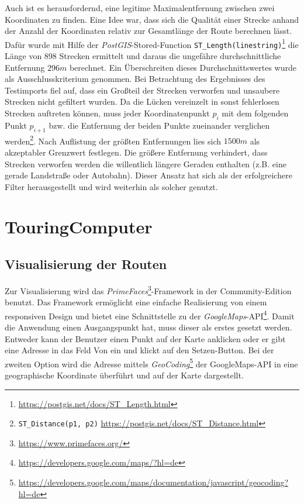 \documentclass[a4paper,11pt,utf8]{scrartcl}
\begin{document}
Auch ist es herausfordernd, eine legitime Maximalentfernung zwischen zwei Koordinaten zu finden. Eine Idee war, dass sich die Qualität einer Strecke anhand der Anzahl der Koordinaten relativ zur Gesamtlänge der Route berechnen lässt. Dafür wurde mit Hilfe der \textit{PostGIS}-Stored-Function \texttt{ST\_Length(linestring)}\footnote{\url{https://postgis.net/docs/ST_Length.html}} die Länge von 898 Strecken ermittelt und daraus die ungefähre durchschnittliche Entfernung $296 m$ berechnet. Ein Überschreiten dieses Durchschnittswertes wurde als Ausschlusskriterium genommen. Bei Betrachtung des Ergebnisses des Testimports fiel auf, dass ein Großteil der Strecken verworfen und unsaubere Strecken nicht gefiltert wurden. Da die \glqq Lücken\grqq{} vereinzelt in sonst fehlerlosen Strecken auftreten können, muss jeder Koordinatenpunkt $p_i$ mit dem folgenden Punkt $p_{i+1}$ bzw. die Entfernung der beiden Punkte zueinander verglichen werden\footnote{\texttt{ST\_Distance(p1, p2)} \url{https://postgis.net/docs/ST_Distance.html}}. Nach Auflistung der größten Entfernungen lies sich $1500 m$ als akzeptabler Grenzwert festlegen. Die größere Entfernung verhindert, dass Strecken verworfen werden die willentlich längere Geraden enthalten (z.B. eine gerade Landstraße oder Autobahn). Dieser Ansatz hat sich als der erfolgreichere Filter herausgestellt und wird weiterhin als solcher genutzt.

\section{TouringComputer}
\subsection{Visualisierung der Routen}
Zur Visualisierung wird das \textit{PrimeFaces}\footnote{\url{https://www.primefaces.org/}}-Framework in der Community-Edition benutzt. Das Framework ermöglicht eine einfache Realisierung von einem responsiven Design und bietet eine Schnittstelle zu der \textit{GoogleMaps}-API\footnote{\url{https://developers.google.com/maps/?hl=de}}. Damit die Anwendung einen Ausgangspunkt hat, muss dieser als erstes gesetzt werden. Entweder kann der Benutzer einen Punkt auf der Karte anklicken oder er gibt eine Adresse in das Feld  \glqq Von\grqq{} ein und klickt auf den Setzen-Button. Bei der zweiten Option wird die Adresse mittels \textit{GeoCoding}\footnote{\url{https://developers.google.com/maps/documentation/javascript/geocoding?hl=de}} der GoogleMaps-API in eine geographische Koordinate überführt und auf der Karte dargestellt. 
\end{document}
